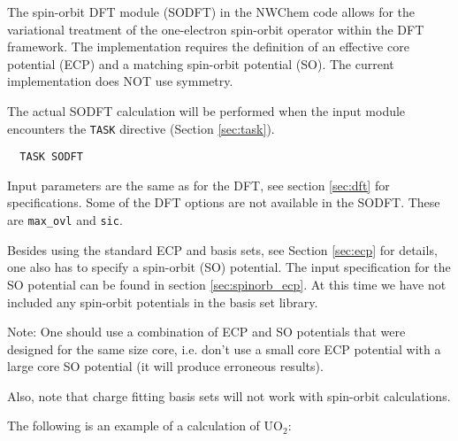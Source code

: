 %
%
\label{sec:sodft}


The spin-orbit DFT module (SODFT) in the NWChem code allows for the variational treatment
of the one-electron spin-orbit operator within the DFT framework. The implementation 
requires the definition of an effective core potential (ECP) and a matching spin-orbit
potential (SO). The current implementation does NOT use symmetry. 

The actual SODFT calculation will be performed when the input module
encounters the \verb+TASK+ directive (Section \ref{sec:task}).  

\begin{verbatim}
  TASK SODFT
\end{verbatim}

Input parameters are the same as for the DFT, see section \ref{sec:dft} for specifications. 
Some of the DFT options are not available in the SODFT. These are \verb+max_ovl+ and 
\verb+sic+.

Besides using the standard ECP and basis sets, see Section \ref{sec:ecp} for details, one 
also has to specify a spin-orbit (SO) potential. The input specification for the SO potential
can be found in section \ref{sec:spinorb_ecp}. At this time we have not included any spin-orbit
potentials in the basis set library.  

Note: One should use a combination of ECP and SO potentials that were designed for the same 
size core, i.e. don't use a small core ECP potential with a large core SO potential (it will
produce erroneous results).

Also, note that charge fitting basis sets will not work with
spin-orbit calculations.

The following is an example of a calculation of $\mathrm{UO_2}$:

